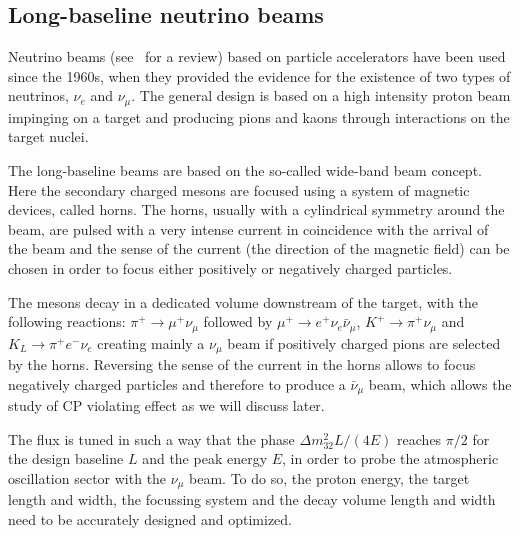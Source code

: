 \subsection{Long-baseline neutrino beams }

Neutrino beams (see~\cite{Kopp2007101} for a review) based on particle accelerators have been used since the 1960s, when they provided the evidence for the existence of two types of neutrinos, $\nu_e$ and $\nu_\mu$. The general design is based on a high intensity proton beam impinging on a target and producing pions and kaons through interactions on the target nuclei. 

The long-baseline beams are based on the so-called wide-band beam concept. Here the secondary charged mesons are focused using a system of magnetic devices, called horns. The horns, usually with a cylindrical symmetry around the beam, are pulsed with a very intense current in coincidence with the arrival of the beam and the sense of the current (the direction of the magnetic field) can be chosen in order to focus either positively or negatively charged particles. 
 
The mesons decay in a dedicated volume downstream of the target, with the following reactions: 
$\pi^+ \rightarrow \mu^+ \nu_\mu$ followed by 
$\mu^+ \rightarrow e^+ \nu_e \bar{\nu}_\mu $,
$K^+ \rightarrow \pi^+ \nu_\mu$ and $K_L \rightarrow \pi^+ e^- \nu_e$
creating mainly a $\nu_\mu$ beam if positively charged pions are selected by the horns. Reversing the sense of the current in the horns allows to focus negatively charged particles and therefore to produce a $\bar{\nu}_\mu$ beam, which allows the study of CP  violating effect as we will discuss later. 
 
The flux is tuned in such a way that the phase $\Delta m^2_{32} L/ (4 E)$ reaches $\pi/2$ for the design baseline $L$ and the peak energy $E$, in order to probe the atmospheric oscillation sector with the $\nu_\mu$ beam. To do so, the proton energy, the target length and width, the focussing system and the decay volume length and width need to be accurately designed and optimized.   

